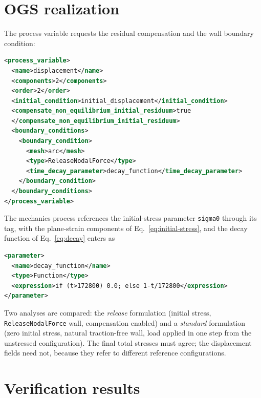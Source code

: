\documentclass[11pt,a4paper]{tubaf-report}
\begin{document}
\begin{center}
\end{center}

\section{OGS realization}

The process variable requests the residual compensation and the wall boundary
condition:
\begin{lstlisting}[language=XML]
<process_variable>
  <name>displacement</name>
  <components>2</components>
  <order>2</order>
  <initial_condition>initial_displacement</initial_condition>
  <compensate_non_equilibrium_initial_residuum>true
  </compensate_non_equilibrium_initial_residuum>
  <boundary_conditions>
    <boundary_condition>
      <mesh>arc</mesh>
      <type>ReleaseNodalForce</type>
      <time_decay_parameter>decay_function</time_decay_parameter>
    </boundary_condition>
  </boundary_conditions>
</process_variable>
\end{lstlisting}
The mechanics process references the initial-stress parameter
\texttt{sigma0} through its  tag, with the
plane-strain components of Eq.~\eqref{eq:initial-stress}, and the decay
function of Eq.~\eqref{eq:decay} enters as
\begin{lstlisting}[language=XML]
<parameter>
  <name>decay_function</name>
  <type>Function</type>
  <expression>if (t>172800) 0.0; else 1-t/172800</expression>
</parameter>
\end{lstlisting}

Two analyses are compared: the \emph{release} formulation (initial stress,
\texttt{ReleaseNodalForce} wall, compensation enabled) and a \emph{standard}
formulation (zero initial stress, natural traction-free wall, load applied in
one step from the unstressed configuration). The final total stresses must
agree; the displacement fields need not, because they refer to different
reference configurations.

\section{Verification results}
\end{document}
